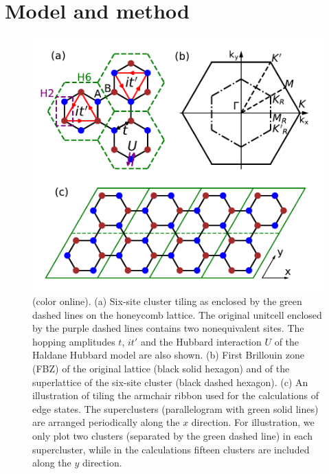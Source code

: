 \documentclass[12pt]{iopart}
\begin{document}
\section{Model and method}\label{MM}

\begin{figure}
\centering
\includegraphics[scale=1.0]{lattice}
\caption{(color online). (a) Six-site cluster tiling as enclosed by the green dashed lines on the honeycomb lattice. The original unitcell enclosed by the purple dashed lines contains two nonequivalent sites. The hopping amplitudes $t$, $it'$ and the Hubbard interaction $U$ of the Haldane Hubbard model are also shown. (b) First Brillouin zone (FBZ) of the original lattice (black solid hexagon) and of the superlattice of the six-site cluster (black dashed hexagon). (c) An illustration of tiling the armchair ribbon used for the calculations of edge states. The superclusters (parallelogram with green solid lines) are arranged periodically along the $x$ direction. For illustration, we only plot two clusters (separated by the green dashed line) in each supercluster, while in the calculations fifteen clusters are included along the $y$ direction.}\label{lattice}
\end{figure}
\end{document}
